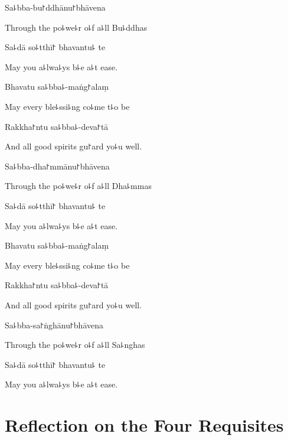 Sa꜕bba-bu꜓ddhānu꜓bhāvena

\begin{english}
  Through the po꜕we꜕r o꜕f a꜕ll Bu꜕ddhas
\end{english}

Sa꜕dā so꜕tthī꜓ bhavantu꜕ te

\begin{english}
  May you a꜕lwa꜕ys b꜕e a꜕t ease.
\end{english}

Bhavatu sa꜕bba꜕-maṅg꜓alaṃ

\begin{english}
  May every ble꜕ssi꜕ng co꜕me t꜕o be
\end{english}

Rakkha꜓ntu sa꜕bba꜕-deva꜓tā

\begin{english}
  And all good spirits gu꜓ard yo꜕u well.
\end{english}

Sa꜕bba-dha꜓mmānu꜓bhāvena

\begin{english}
  Through the po꜕we꜕r o꜕f a꜕ll Dha꜕mmas
\end{english}

Sa꜕dā so꜕tthī꜓ bhavantu꜕ te

\begin{english}
  May you a꜕lwa꜕ys b꜕e a꜕t ease.
\end{english}

Bhavatu sa꜕bba꜕-maṅg꜓alaṃ

\begin{english}
  May every ble꜕ssi꜕ng co꜕me t꜕o be
\end{english}

Rakkha꜓ntu sa꜕bba꜕-deva꜓tā

\begin{english}
  And all good spirits gu꜓ard yo꜕u well.
\end{english}

Sa꜕bba-sa꜓ṅghānu꜓bhāvena

\begin{english}
  Through the po꜕we꜕r o꜕f a꜕ll Sa꜕nghas
\end{english}

Sa꜕dā so꜕tthī꜓ bhavantu꜕ te

\begin{english}
  May you a꜕lwa꜕ys b꜕e a꜕t ease.
\end{english}

\chapter[Four Requisites]{Reflection on the Four Requisites}%

